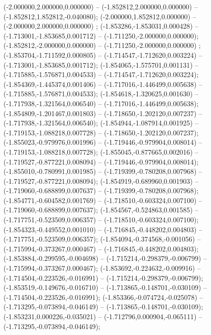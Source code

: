  (-2.000000,2.000000,0.000000) -- (-1.852812,2.000000,0.000000) -- (-1.852812,1.852812,-0.040080);
 (-2.000000,1.852812,0.000000) -- (-2.000000,2.000000,0.000000) ;
 (-1.853286,-1.853031,0.000428) -- (-1.713001,-1.853685,0.001712) -- (-1.711250,-2.000000,0.000000);
 (-1.852812,-2.000000,0.000000) -- (-1.711250,-2.000000,0.000000) ;
 (-1.853704,-1.711592,0.000805) -- (-1.714547,-1.712620,0.003224) -- (-1.713001,-1.853685,0.001712);
 (-1.854065,-1.575701,0.001131) -- (-1.715885,-1.576871,0.004533) -- (-1.714547,-1.712620,0.003224);
 (-1.854369,-1.445374,0.001406) -- (-1.717016,-1.446499,0.005638) -- (-1.715885,-1.576871,0.004533);
 (-1.854618,-1.320625,0.001630) -- (-1.717938,-1.321564,0.006540) -- (-1.717016,-1.446499,0.005638);
 (-1.854809,-1.201467,0.001803) -- (-1.718650,-1.202120,0.007237) -- (-1.717938,-1.321564,0.006540);
 (-1.854944,-1.087914,0.001925) -- (-1.719153,-1.088218,0.007728) -- (-1.718650,-1.202120,0.007237);
 (-1.855023,-0.979976,0.001996) -- (-1.719446,-0.979904,0.008014) -- (-1.719153,-1.088218,0.007728);
 (-1.855045,-0.877665,0.002016) -- (-1.719527,-0.877221,0.008094) -- (-1.719446,-0.979904,0.008014);
 (-1.855010,-0.780991,0.001985) -- (-1.719399,-0.780208,0.007968) -- (-1.719527,-0.877221,0.008094);
 (-1.854919,-0.689960,0.001903) -- (-1.719060,-0.688899,0.007637) -- (-1.719399,-0.780208,0.007968);
 (-1.854771,-0.604582,0.001769) -- (-1.718510,-0.603324,0.007100) -- (-1.719060,-0.688899,0.007637);
 (-1.854567,-0.524863,0.001585) -- (-1.717751,-0.523509,0.006357) -- (-1.718510,-0.603324,0.007100);
 (-1.854323,-0.449552,0.001010) -- (-1.716845,-0.448202,0.004803) -- (-1.717751,-0.523509,0.006357);
 (-1.854094,-0.374568,-0.001056) -- (-1.715994,-0.373267,0.000467) -- (-1.716845,-0.448202,0.004803);
 (-1.853884,-0.299595,-0.004698) -- (-1.715214,-0.298379,-0.006799) -- (-1.715994,-0.373267,0.000467);
 (-1.853692,-0.224632,-0.009916) -- (-1.714504,-0.223526,-0.016991) -- (-1.715214,-0.298379,-0.006799);
 (-1.853519,-0.149676,-0.016710) -- (-1.713865,-0.148701,-0.030109) -- (-1.714504,-0.223526,-0.016991);
 (-1.853366,-0.074724,-0.025078) -- (-1.713295,-0.073894,-0.046149) -- (-1.713865,-0.148701,-0.030109);
 (-1.853231,0.000226,-0.035021) -- (-1.712796,0.000904,-0.065111) -- (-1.713295,-0.073894,-0.046149);

